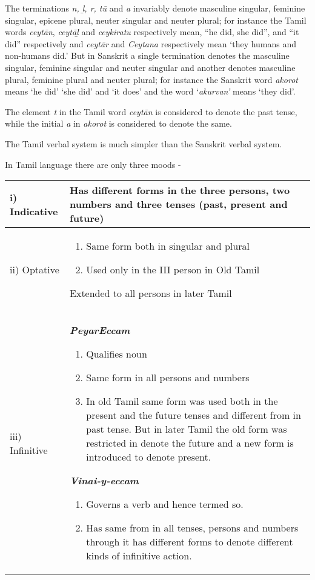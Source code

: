 The terminations \textit{n, ḻ, r, tū} and \textit{a} invariably denote masculine singular, feminine singular, epicene plural, neuter singular and neuter plural; for instance the Tamil words \textit{ceytān}, \textit{ceytāḻ} and \textit{ceykiratu} respectively mean, “he did, she did”, and “it did” respectively and \textit{ceytār} and \textit{Ceytana} respectively mean ‘they humans and non-humans did.’ But in Sanskrit a single termination denotes the masculine singular, feminine singular and neuter singular and another denotes masculine plural, feminine plural and neuter plural; for instance the Sanskrit word \textit{akorot} means ‘he did’ ‘she did’ and ‘it does’ and the word ‘\textit{akurvan’} means ‘they did’.

The element \textit{t} in the Tamil word \textit{ceytān} is considered to denote the past tense, while the initial \textit{a} in \textit{akorot} is considered to denote the same.

The Tamil verbal system is much simpler than the Sanskrit verbal system.

In Tamil language there are only three moods -

\begin{longtable}{|m{2.4cm}|m{6.7cm}|}
\hline
i) Indicative & Has different forms in the three persons, two numbers and three tenses (past, present and future) \\
\hline
ii) Optative & 
							
\begin{enumerate}\item Same form both in singular and plural 
								\item Used only in the III person in Old Tamil
							
\end{enumerate}
Extended to all persons  in later Tamil

						 \tabularnewline
\hline
iii) Infinitive & 
							\textbf{\textit{PeyarEccam}}

							
\begin{enumerate}\item Qualifies noun
								\item Same form in all persons and numbers
								\item In old Tamil same form was used both in the present and the future tenses and different from in past tense. But in later Tamil the old form was restricted in denote the future and a new form is introduced to denote present.
							
\end{enumerate}
\textbf{\textit{Vinai-y-eccam}}

							
\begin{enumerate}\item Governs a verb and hence termed so.
								\item Has same from in all tenses, persons and numbers through it has different forms to denote different kinds of infinitive action.
							
\end{enumerate}
 \tabularnewline
\hline
\end{longtable}

